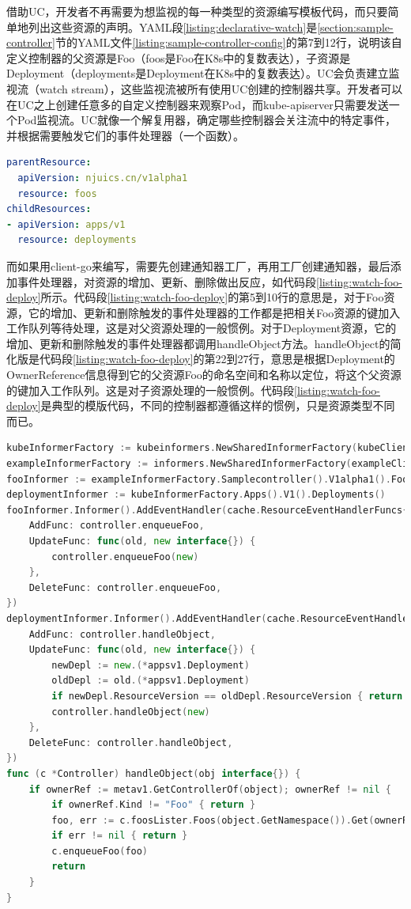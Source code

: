 \documentclass[macfonts,master]{njuthesis}
\begin{document}
借助UC，开发者不再需要为想监视的每一种类型的资源编写模板代码，而只要简单地列出这些资源的声明。YAML段\ref{listing:declarative-watch}是\ref{section:sample-controller}节的YAML文件\ref{listing:sample-controller-config}的第7到12行，说明该自定义控制器的父资源是Foo（foos是Foo在K8s中的复数表达），子资源是Deployment（deployments是Deployment在K8s中的复数表达）。UC会负责建立监视流（watch stream），这些监视流被所有使用UC创建的控制器共享。开发者可以在UC之上创建任意多的自定义控制器来观察Pod，而kube-apiserver只需要发送一个Pod监视流。UC就像一个解复用器，确定哪些控制器会关注流中的特定事件，并根据需要触发它们的事件处理器（一个函数）。
\begin{lstlisting}[language=yaml,caption=声明式的监视,label=listing:declarative-watch]
parentResource:
  apiVersion: njuics.cn/v1alpha1
  resource: foos
childResources:
- apiVersion: apps/v1
  resource: deployments
\end{lstlisting}

而如果用client-go来编写，需要先创建通知器工厂，再用工厂创建通知器，最后添加事件处理器，对资源的增加、更新、删除做出反应，如代码段\ref{listing:watch-foo-deploy}所示。代码段\ref{listing:watch-foo-deploy}的第5到10行的意思是，对于Foo资源，它的增加、更新和删除触发的事件处理器的工作都是把相关Foo资源的键加入工作队列等待处理，这是对父资源处理的一般惯例。对于Deployment资源，它的增加、更新和删除触发的事件处理器都调用handleObject方法。handleObject的简化版是代码段\ref{listing:watch-foo-deploy}的第22到27行，意思是根据Deployment的OwnerReference信息得到它的父资源Foo的命名空间和名称以定位，将这个父资源的键加入工作队列。这是对子资源处理的一般惯例。代码段\ref{listing:watch-foo-deploy}是典型的模版代码，不同的控制器都遵循这样的惯例，只是资源类型不同而已。

\begin{lstlisting}[language=Go,caption=sample-controller中监视Foo和Deployment的代码段,label=listing:watch-foo-deploy]
kubeInformerFactory := kubeinformers.NewSharedInformerFactory(kubeClient, time.Second*30)
exampleInformerFactory := informers.NewSharedInformerFactory(exampleClient, time.Second*30)
fooInformer := exampleInformerFactory.Samplecontroller().V1alpha1().Foos()
deploymentInformer := kubeInformerFactory.Apps().V1().Deployments()
fooInformer.Informer().AddEventHandler(cache.ResourceEventHandlerFuncs{
	AddFunc: controller.enqueueFoo,
	UpdateFunc: func(old, new interface{}) {
		controller.enqueueFoo(new)
	},
	DeleteFunc: controller.enqueueFoo,
})
deploymentInformer.Informer().AddEventHandler(cache.ResourceEventHandlerFuncs{
	AddFunc: controller.handleObject,
	UpdateFunc: func(old, new interface{}) {
		newDepl := new.(*appsv1.Deployment)
		oldDepl := old.(*appsv1.Deployment)
		if newDepl.ResourceVersion == oldDepl.ResourceVersion { return }
		controller.handleObject(new)
	},
	DeleteFunc: controller.handleObject,
})
func (c *Controller) handleObject(obj interface{}) {
	if ownerRef := metav1.GetControllerOf(object); ownerRef != nil {
		if ownerRef.Kind != "Foo" { return }
		foo, err := c.foosLister.Foos(object.GetNamespace()).Get(ownerRef.Name)
		if err != nil { return }
		c.enqueueFoo(foo)
		return
	}
}
\end{lstlisting}
\end{document}
